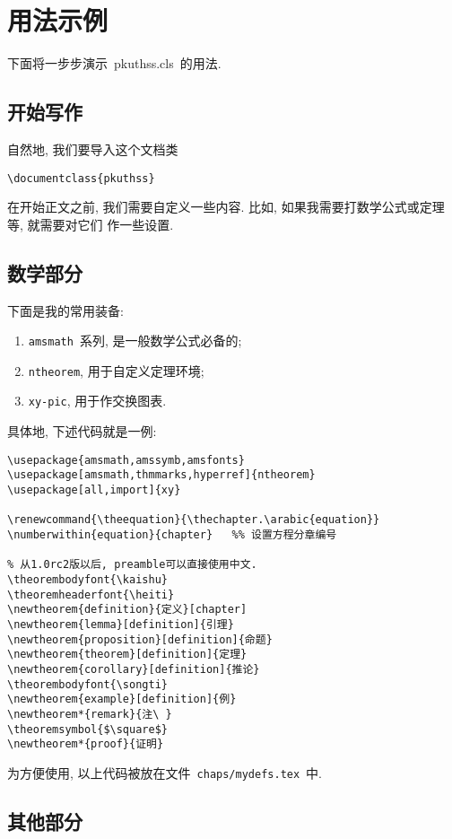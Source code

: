 \chapter{用法示例}

下面将一步步演示~pkuthss.cls~的用法.

\section{开始写作}

自然地, 我们要导入这个文档类
\begin{verbatim}
\documentclass{pkuthss}
\end{verbatim}

在开始正文之前, 我们需要自定义一些内容.
比如, 如果我需要打数学公式或定理等, 就需要对它们
作一些设置.

\section{数学部分}

下面是我的常用装备:
\begin{enumerate}
\item \verb|amsmath|~系列, 是一般数学公式必备的;
\item \verb|ntheorem|, 用于自定义定理环境;
\item \verb|xy-pic|, 用于作交换图表.
\end{enumerate}

具体地, 下述代码就是一例:
\begin{verbatim}
\usepackage{amsmath,amssymb,amsfonts}
\usepackage[amsmath,thmmarks,hyperref]{ntheorem}
\usepackage[all,import]{xy}

\renewcommand{\theequation}{\thechapter.\arabic{equation}}
\numberwithin{equation}{chapter}   %% 设置方程分章编号

% 从1.0rc2版以后, preamble可以直接使用中文.
\theorembodyfont{\kaishu}
\theoremheaderfont{\heiti}
\newtheorem{definition}{定义}[chapter]
\newtheorem{lemma}[definition]{引理}
\newtheorem{proposition}[definition]{命题}
\newtheorem{theorem}[definition]{定理}
\newtheorem{corollary}[definition]{推论}
\theorembodyfont{\songti}
\newtheorem{example}[definition]{例}
\newtheorem*{remark}{注\ }
\theoremsymbol{$\square$}
\newtheorem*{proof}{证明}
\end{verbatim}

为方便使用, 以上代码被放在文件~\verb|chaps/mydefs.tex|~中.

\section{其他部分}


